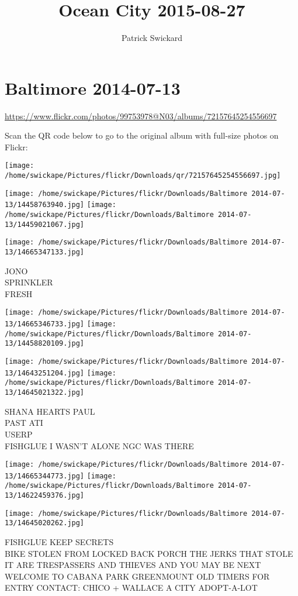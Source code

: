 \documentclass[10pt,letterpaper]{article}
\title{Ocean City 2015-08-27}
\author{Patrick Swickard}
\date{}
\begin{document}
\section*{Baltimore 2014-07-13}

\url{https://www.flickr.com/photos/99753978@N03/albums/72157645254556697}

Scan the QR code below to go to the original album with full-size photos on Flickr:

\texttt{[image: /home/swickape/Pictures/flickr/Downloads/qr/72157645254556697.jpg]}
\pagebreak

\texttt{[image: /home/swickape/Pictures/flickr/Downloads/Baltimore 2014-07-13/14458763940.jpg]}
\texttt{[image: /home/swickape/Pictures/flickr/Downloads/Baltimore 2014-07-13/14459021067.jpg]}

\vspace{0.25in}
\texttt{[image: /home/swickape/Pictures/flickr/Downloads/Baltimore 2014-07-13/14665347133.jpg]}

JONO\\
SPRINKLER\\
FRESH
\pagebreak

\texttt{[image: /home/swickape/Pictures/flickr/Downloads/Baltimore 2014-07-13/14665346733.jpg]}
\texttt{[image: /home/swickape/Pictures/flickr/Downloads/Baltimore 2014-07-13/14458820109.jpg]}

\texttt{[image: /home/swickape/Pictures/flickr/Downloads/Baltimore 2014-07-13/14643251204.jpg]}
\texttt{[image: /home/swickape/Pictures/flickr/Downloads/Baltimore 2014-07-13/14645021322.jpg]}

SHANA HEARTS PAUL\\
PAST ATI\\
USERP\\
FISHGLUE I WASN'T ALONE NGC WAS THERE
\pagebreak

\texttt{[image: /home/swickape/Pictures/flickr/Downloads/Baltimore 2014-07-13/14665344773.jpg]}
\texttt{[image: /home/swickape/Pictures/flickr/Downloads/Baltimore 2014-07-13/14622459376.jpg]}

\vspace{0.25in}
\texttt{[image: /home/swickape/Pictures/flickr/Downloads/Baltimore 2014-07-13/14645020262.jpg]}

FISHGLUE KEEP SECRETS\\
BIKE STOLEN FROM LOCKED BACK PORCH THE JERKS THAT STOLE IT ARE TRESPASSERS AND THIEVES AND YOU MAY BE NEXT\\
WELCOME TO CABANA PARK GREENMOUNT OLD TIMERS FOR ENTRY CONTACT: CHICO + WALLACE A CITY ADOPT{-}A{-}LOT
\pagebreak
\end{document}
